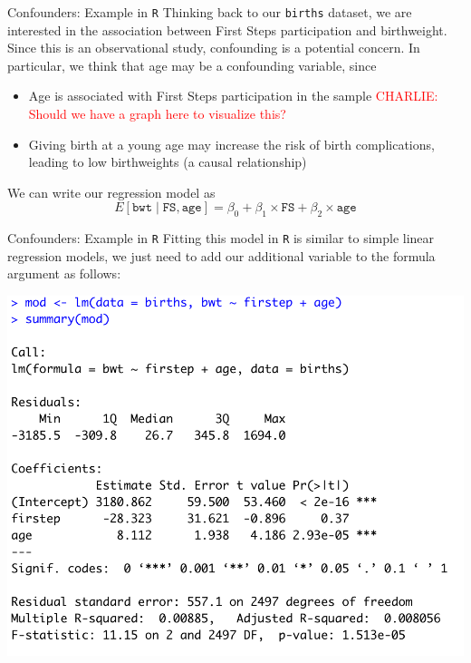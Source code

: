 \documentclass[10pt,t]{beamer}
\begin{document}
\begin{frame}{Confounders: Example in \texttt{R}}
Thinking back to our \texttt{births} dataset, we are interested in the association between First Steps participation and birthweight. Since this is an observational study, confounding is a potential concern. In particular, we think that age may be a confounding variable, since 

\vspace{0.3cm}

\begin{itemize}
	\item Age is associated with First Steps participation in the sample \textcolor{red}{CHARLIE: Should we have a graph here to visualize this?}
	\item Giving birth at a young age may increase the risk of birth complications, leading to low birthweights (a causal relationship)
\end{itemize} \pause

\vspace{0.3cm}

We can write our regression model as
$$
E[\texttt{bwt} \mid \texttt{FS}, \texttt{age}] = \beta_0 + \beta_1 \times \texttt{FS} + \beta_2 \times \texttt{age}
$$
\end{frame}

\begin{frame}{Confounders: Example in \texttt{R}}
Fitting this model in \texttt{R} is similar to simple linear regression models, we just need to add our additional variable to the formula argument as follows:

\vspace{0.3cm}

\centering \includegraphics[scale=0.4]{confound_code.png}
\end{frame}
\end{document}
